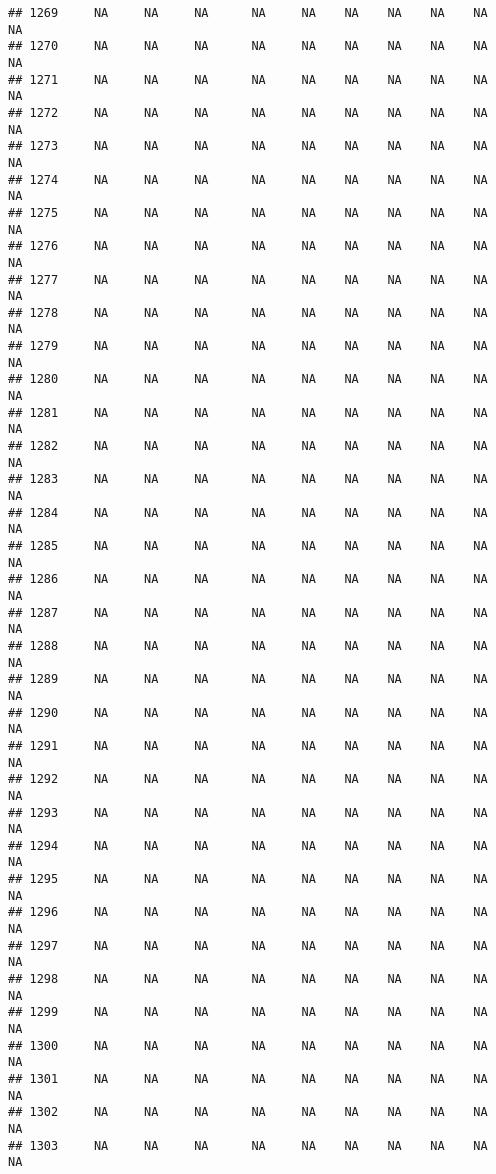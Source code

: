 \documentclass{article}\usepackage{graphicx, color}
\makeatletter
\newenvironment{kframe}{%
 \def\at@end@of@kframe{}%
 \ifinner\ifhmode%
  \def\at@end@of@kframe{\end{minipage}}%
  \begin{minipage}{\columnwidth}%
 \fi\fi%
 \def\FrameCommand##1{\hskip\@totalleftmargin \hskip-\fboxsep
 \colorbox{shadecolor}{##1}\hskip-\fboxsep
     \hskip-\linewidth \hskip-\@totalleftmargin \hskip\columnwidth}%
 \MakeFramed {\advance\hsize-\width
   \@totalleftmargin\z@ \linewidth\hsize
   \@setminipage}}%
 {\par\unskip\endMakeFramed%
 \at@end@of@kframe}
\newenvironment{knitrout}{}{} %
\makeatother
\begin{document}
\begin{knitrout}
\begin{kframe}
\begin{verbatim}
## 1269     NA     NA     NA      NA     NA    NA    NA    NA    NA     NA
## 1270     NA     NA     NA      NA     NA    NA    NA    NA    NA     NA
## 1271     NA     NA     NA      NA     NA    NA    NA    NA    NA     NA
## 1272     NA     NA     NA      NA     NA    NA    NA    NA    NA     NA
## 1273     NA     NA     NA      NA     NA    NA    NA    NA    NA     NA
## 1274     NA     NA     NA      NA     NA    NA    NA    NA    NA     NA
## 1275     NA     NA     NA      NA     NA    NA    NA    NA    NA     NA
## 1276     NA     NA     NA      NA     NA    NA    NA    NA    NA     NA
## 1277     NA     NA     NA      NA     NA    NA    NA    NA    NA     NA
## 1278     NA     NA     NA      NA     NA    NA    NA    NA    NA     NA
## 1279     NA     NA     NA      NA     NA    NA    NA    NA    NA     NA
## 1280     NA     NA     NA      NA     NA    NA    NA    NA    NA     NA
## 1281     NA     NA     NA      NA     NA    NA    NA    NA    NA     NA
## 1282     NA     NA     NA      NA     NA    NA    NA    NA    NA     NA
## 1283     NA     NA     NA      NA     NA    NA    NA    NA    NA     NA
## 1284     NA     NA     NA      NA     NA    NA    NA    NA    NA     NA
## 1285     NA     NA     NA      NA     NA    NA    NA    NA    NA     NA
## 1286     NA     NA     NA      NA     NA    NA    NA    NA    NA     NA
## 1287     NA     NA     NA      NA     NA    NA    NA    NA    NA     NA
## 1288     NA     NA     NA      NA     NA    NA    NA    NA    NA     NA
## 1289     NA     NA     NA      NA     NA    NA    NA    NA    NA     NA
## 1290     NA     NA     NA      NA     NA    NA    NA    NA    NA     NA
## 1291     NA     NA     NA      NA     NA    NA    NA    NA    NA     NA
## 1292     NA     NA     NA      NA     NA    NA    NA    NA    NA     NA
## 1293     NA     NA     NA      NA     NA    NA    NA    NA    NA     NA
## 1294     NA     NA     NA      NA     NA    NA    NA    NA    NA     NA
## 1295     NA     NA     NA      NA     NA    NA    NA    NA    NA     NA
## 1296     NA     NA     NA      NA     NA    NA    NA    NA    NA     NA
## 1297     NA     NA     NA      NA     NA    NA    NA    NA    NA     NA
## 1298     NA     NA     NA      NA     NA    NA    NA    NA    NA     NA
## 1299     NA     NA     NA      NA     NA    NA    NA    NA    NA     NA
## 1300     NA     NA     NA      NA     NA    NA    NA    NA    NA     NA
## 1301     NA     NA     NA      NA     NA    NA    NA    NA    NA     NA
## 1302     NA     NA     NA      NA     NA    NA    NA    NA    NA     NA
## 1303     NA     NA     NA      NA     NA    NA    NA    NA    NA     NA

\end{verbatim}
\end{kframe}
\end{knitrout}
\end{document}
